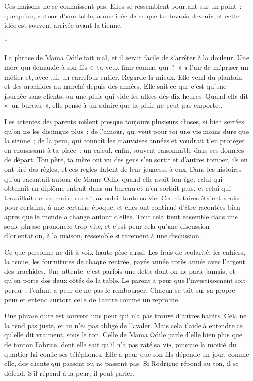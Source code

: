 \documentclass[10.5pt,twoside,openright]{book}
\newcommand{\asterisme}{\par\vspace{0.7em}\centerline{\color{gris}*\quad*\quad*}\vspace{0.7em}\par\noindent}
\begin{document}
Ces maisons ne se connaissent pas. Elles se ressemblent pourtant sur un point : quelqu’un, autour d’une table, a une idée de ce que tu devrais devenir, et cette idée est souvent arrivée avant la tienne.

\asterisme

La phrase de Mama Odile fait mal, et il serait facile de s’arrêter à la douleur. Une mère qui demande à son fils « tu veux finir comme qui ? » a l’air de mépriser un métier et, avec lui, un carrefour entier. Regarde-la mieux. Elle vend du plantain et des arachides au marché depuis des années. Elle sait ce que c’est qu’une journée sans clients, ou une pluie qui vide les allées dès dix heures. Quand elle dit « un bureau », elle pense à un salaire que la pluie ne peut pas emporter.

Les attentes des parents mêlent presque toujours plusieurs choses, si bien serrées qu’on ne les distingue plus : de l’amour, qui veut pour toi une vie moins dure que la sienne ; de la peur, qui connaît les mauvaises années et voudrait t’en protéger en choisissant à ta place ; un calcul, enfin, souvent raisonnable dans ses données de départ. Ton père, ta mère ont vu des gens s’en sortir et d’autres tomber, ils en ont tiré des règles, et ces règles datent de leur jeunesse à eux. Dans les histoires qu’on racontait autour de Mama Odile quand elle avait ton âge, celui qui obtenait un diplôme entrait dans un bureau et n’en sortait plus, et celui qui travaillait de ses mains restait au soleil toute sa vie. Ces histoires étaient vraies pour certains, à une certaine époque, et elles ont continué d’être racontées bien après que le monde a changé autour d’elles. Tout cela tient ensemble dans une seule phrase prononcée trop vite, et c’est pour cela qu’une discussion d’orientation, à la maison, ressemble si rarement à une discussion.

Ce que personne ne dit à voix haute pèse aussi. Les frais de scolarité, les cahiers, la tenue, les fournitures de chaque rentrée, payés année après année avec l’argent des arachides. Une attente, c’est parfois une dette dont on ne parle jamais, et qu’on porte des deux côtés de la table. Le parent a peur que l’investissement soit perdu ; l’enfant a peur de ne pas le rembourser. Chacun se tait sur sa propre peur et entend surtout celle de l’autre comme un reproche.

Une phrase dure est souvent une peur qui n’a pas trouvé d’autres habits. Cela ne la rend pas juste, et tu n’es pas obligé de l’avaler. Mais cela t’aide à entendre ce qu’elle dit vraiment, sous le ton. Celle de Mama Odile parle d’elle bien plus que de tonton Fabrice, dont elle sait qu’il n’a pas raté sa vie, puisque la moitié du quartier lui confie ses téléphones. Elle a peur que son fils dépende un jour, comme elle, des clients qui passent ou ne passent pas. Si Rodrigue répond au ton, il se défend. S’il répond à la peur, il peut parler.
\end{document}
